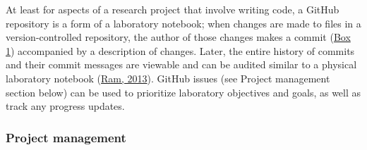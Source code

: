 At least for aspects of a research project that involve writing code, a GitHub repository is a form of a laboratory notebook; when changes are made to files in a version-controlled repository, the author of those changes makes a commit (\protect\hyperlink{definitions}{Box 1}) accompanied by a description of changes.
Later, the entire history of commits and their commit messages are viewable and can be audited similar to a physical laboratory notebook (\protect\hyperlink{ref-4ny1onB0}{Ram, 2013}).
GitHub issues (see Project management section below) can be used to prioritize laboratory objectives and goals, as well as track any progress updates.

\hypertarget{project-management}{%
\subsubsection{Project management}\label{project-management}}

